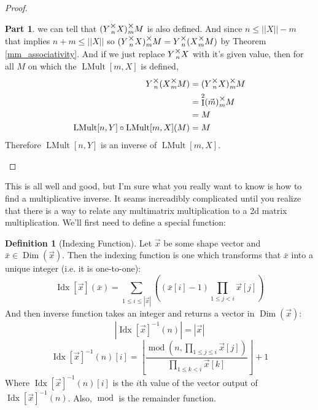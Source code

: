 \documentclass[12pt]{book}
\theoremstyle{plain}
\theoremstyle{definition}
\newtheorem{definition}{Definition}[chapter]
\theoremstyle{ppart}
\newtheorem{ppart}{Part}
\theoremstyle{case}
\theoremstyle{solution}
\DeclareMathOperator{\Dim}{Dim}
\DeclareMathOperator{\Ident}{I}
\DeclareMathOperator{\remainder}{mod}
\DeclareMathOperator{\LMult}{LMult}
\DeclareMathOperator{\Idx}{Idx}
\newcommand{\mmult}[1]{\text{\raisebox{1ex}{$\underset{#1}{\times}$}}}
\begin{document}
\begin{proof}
\begin{ppart}
we can tell that $(Y \mmult{n} X) \mmult{m} M$ is also defined.
And since $n \le ||X||-m$ that implies $n+m \le ||X||$ so $(Y \mmult{n} X) \mmult{m} M = Y \mmult{n} (X \mmult{m} M)$
by Theorem \ref{mm_associativity}.
And if we just replace $Y \mmult{n} X$ with it's given value, then for all $M$ on which the $\LMult[m,X]$ is defined,
\begin{align*}
  Y \mmult{n} (X \mmult{m} M) &= (Y \mmult{n} X) \mmult{m} M  \\
  &= \Ident^2(\vec{m}) \mmult{m} M\\
  &= M \\
  \LMult[n,Y] \circ \LMult[m,X](M) &= M
\end{align*}
Therefore $\LMult[n,Y]$ is an inverse of $\LMult[m,X]$.
\end{ppart}
\end{proof}
 
This is all well and good, but I'm sure what you really want to know is how to find a multiplicative inverse.
It seams increadibly complicated until you realize that there is a way to relate any multimatrix multiplication
to a 2d matrix multiplication. We'll first need to define a special function:

\begin{definition}[Indexing Function]
Let $\vec{x}$ be some shape vector and $\bar{x} \in \Dim(\vec{x})$. Then the indexing function is one which transforms
that $\bar{x}$ into a unique integer (i.e. it is one-to-one):
\[
  \Idx[\vec{x}](\bar{x}) = \sum_{1 \le i \le |\vec{x}|} \left( (\bar{x}[i]-1) \prod_{1 \le j < i} \vec{x}[j] \right)
\]
And then inverse function takes an integer and returns a vector in $\Dim(\vec{x})$:
\[ |\Idx[\vec{x}]^{-1}(n)| = |\vec{x}| \]
\[
  \Idx[\vec{x}]^{-1}(n)[i] =
    \left\lfloor
      \frac{\remainder\left(n, \prod_{1 \le j \le i} \vec{x}[j]\right)}
      {\prod_{1 \le k < i} \vec{x}[k]}
    \right\rfloor + 1
\]
Where $\Idx[\vec{x}]^{-1}(n)[i]$ is the $i$th value of the vector output of $\Idx[\vec{x}]^{-1}(n)$.
Also, $\remainder$ is the remainder function.
\end{definition}
\end{document}

